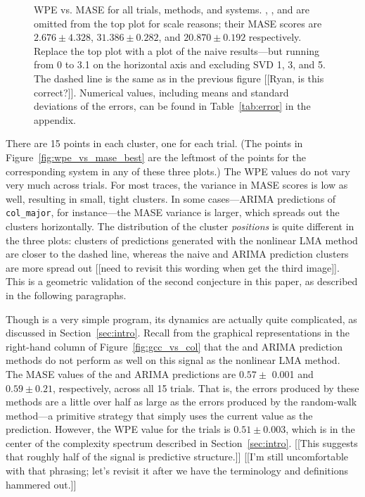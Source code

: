 \begin{figure}
\caption{WPE vs. MASE for all trials, methods, and systems.  \svdone,
  \svdthree, and \svdfive are omitted from the top plot for scale
  reasons; their MASE scores are $2.676 \pm 4.328$, $31.386 \pm
  0.282$, and $20.870 \pm 0.192$ respectively.  {\color{red}Replace
    the top plot with a plot of the naive results---but running from 0
    to 3.1 on the horizontal axis and excluding SVD 1, 3, and 5}.  The
  dashed line is the same as in the previous figure [[Ryan, is this
      correct?]].  Numerical values, including means and standard
  deviations of the errors, can be found in Table~\ref{tab:error} in
  the appendix.
% 
% 
}
    \label{fig:wpe_vs_mase_all}
\end{figure} 
There are 15 points in each cluster, one for each trial.  (The points
in Figure~\ref{fig:wpe_vs_mase_best} are the leftmost of the points
for the corresponding system in any of these three plots.)  The WPE
values do not vary very much across trials.  For most traces, the
variance in MASE scores is low as well, resulting in small, tight
clusters.  In some cases---ARIMA predictions of {\tt col\_major}, for
instance---the MASE variance is larger, which spreads out the clusters
horizontally.  The distribution of the cluster {\sl positions} is
quite different in the three plots: clusters of predictions generated
with the nonlinear LMA method are closer to the dashed line, whereas
the naive and ARIMA prediction clusters are more spread out [[need to
    revisit this wording when get the third image]].  This is a
geometric validation of the second conjecture in this paper, as
described in the following paragraphs.

Though \col is a very simple program, its dynamics are actually quite
complicated, as discussed in Section~\ref{sec:intro}.  Recall from the
graphical representations in the right-hand column of
Figure~\ref{fig:gcc_vs_col} that the \naive and ARIMA prediction
methods do not perform as well on this signal as the nonlinear LMA
method.  The MASE values of the \naive and ARIMA predictions are $0.57
\pm$ 0.001 and $0.59 \pm 0.21$, respectively, across all 15 trials.
That is, the errors produced by these methods are a little over half
as large as the errors produced by the random-walk method---a
primitive strategy that simply uses the current value as the
prediction.  However, the WPE value for the \col trials is $0.51 \pm
0.003$, which is in the center of the complexity spectrum described in
Section~\ref{sec:intro}.  [[This suggests that roughly half of the
    signal is predictive structure.]]  [[I'm still uncomfortable with
    that phrasing; let's revisit it after we have the terminology and
    definitions hammered out.]]  


